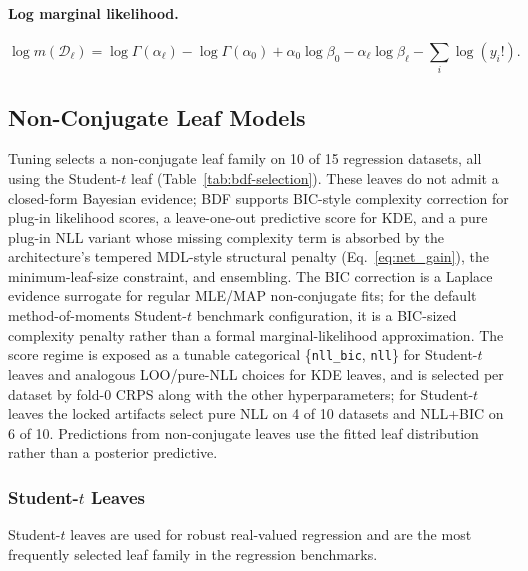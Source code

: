 \documentclass[10pt]{article} %
\begin{document}
\paragraph{Log marginal likelihood.}
\begin{equation}\label{eq:poisson_log_marginal}
\log m(\mathcal{D}_\ell)
=
\log\Gamma(\alpha_\ell)-\log\Gamma(\alpha_0)
+\alpha_0\log\beta_0
-\alpha_\ell\log\beta_\ell
-\sum_i \log(y_i!).
\end{equation}

\subsection{Non-Conjugate Leaf Models}\label{app:nonconjugate_updates}

Tuning selects a non-conjugate leaf family on 10 of 15 regression datasets, all using the Student-$t$ leaf (Table~\ref{tab:bdf-selection}). These leaves do not admit a closed-form Bayesian evidence; BDF supports BIC-style complexity correction for plug-in likelihood scores, a leave-one-out predictive score for KDE, and a pure plug-in NLL variant whose missing complexity term is absorbed by the architecture's tempered MDL-style structural penalty (Eq.~\eqref{eq:net_gain}), the minimum-leaf-size constraint, and ensembling. The BIC correction is a Laplace evidence surrogate for regular MLE/MAP non-conjugate fits; for the default method-of-moments Student-$t$ benchmark configuration, it is a BIC-sized complexity penalty rather than a formal marginal-likelihood approximation. The score regime is exposed as a tunable categorical \{\texttt{nll\_bic}, \texttt{nll}\} for Student-$t$ leaves and analogous LOO/pure-NLL choices for KDE leaves, and is selected per dataset by fold-0 CRPS along with the other hyperparameters; for Student-$t$ leaves the locked artifacts select pure NLL on 4 of 10 datasets and NLL+BIC on 6 of 10. Predictions from non-conjugate leaves use the fitted leaf distribution rather than a posterior predictive.

\subsubsection{Student-\texorpdfstring{$t$}{t} Leaves}\label{app:student_t_leaves}

Student-$t$ leaves are used for robust real-valued regression and are the most frequently selected leaf family in the regression benchmarks.
\end{document}

